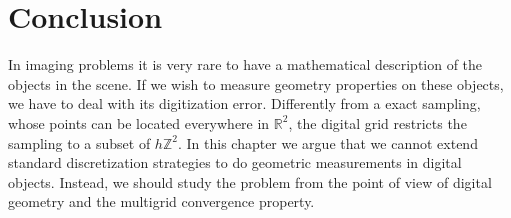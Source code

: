 \section{Conclusion}

In imaging problems it is very rare to have a mathematical description of the objects in the scene. If we wish to measure geometry properties on these objects, we have to deal with its digitization error. Differently from a exact sampling, whose points can be located everywhere in $\mathbb{R}^2$, the digital grid restricts the sampling to a subset of $h\mathbb{Z}^2$. In this chapter we argue that we cannot extend standard discretization strategies to do geometric measurements in digital objects. Instead, we should study the problem from the point of view of digital geometry and the multigrid convergence property.


